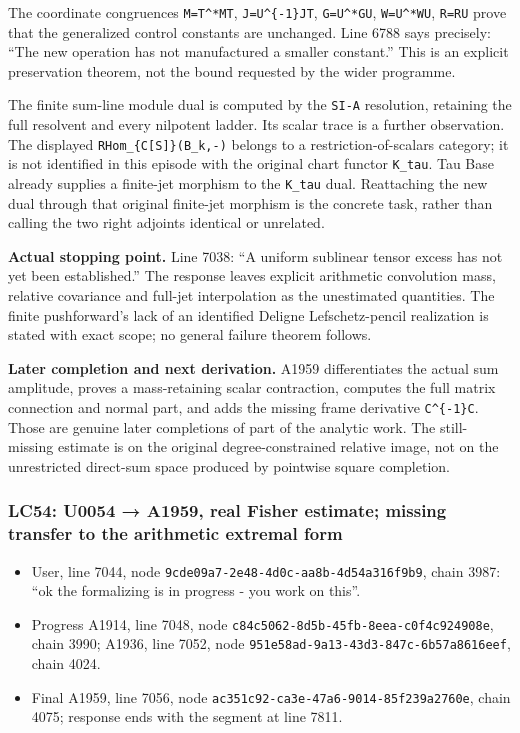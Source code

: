 The coordinate congruences \texttt{M\textquotesingle{}=T\^{}*MT},
\texttt{J\textquotesingle{}=U\^{}\{-1\}JT},
\texttt{G\textquotesingle{}=U\^{}*GU},
\texttt{W\textquotesingle{}=U\^{}*WU}, \texttt{R\textquotesingle{}=RU}
prove that the generalized control constants are unchanged. Line 6788
says precisely: ``The new operation has not manufactured a smaller
constant.'' This is an explicit preservation theorem, not the bound
requested by the wider programme.

The finite sum-line module dual is computed by the \texttt{SI-A}
resolution, retaining the full resolvent and every nilpotent ladder. Its
scalar trace is a further observation. The displayed
\texttt{RHom\_\{C{[}S{]}\}(B\_k,-)} belongs to a restriction-of-scalars
category; it is not identified in this episode with the original chart
functor \texttt{K\_tau}. Tau Base already supplies a finite-jet morphism
to the \texttt{K\_tau} dual. Reattaching the new dual through that
original finite-jet morphism is the concrete task, rather than calling
the two right adjoints identical or unrelated.

\textbf{Actual stopping point.} Line 7038: ``A uniform sublinear tensor
excess has not yet been established.'' The response leaves explicit
arithmetic convolution mass, relative covariance and full-jet
interpolation as the unestimated quantities. The finite pushforward's
lack of an identified Deligne Lefschetz-pencil realization is stated
with exact scope; no general failure theorem follows.

\textbf{Later completion and next derivation.} A1959 differentiates the
actual sum amplitude, proves a mass-retaining scalar contraction,
computes the full matrix connection and normal part, and adds the
missing frame derivative \texttt{C\^{}\{-1\}C\textquotesingle{}}. Those
are genuine later completions of part of the analytic work. The
still-missing estimate is on the original degree-constrained relative
image, not on the unrestricted direct-sum space produced by pointwise
square completion.

\subsubsection{LC54: U0054 → A1959, real Fisher estimate; missing
transfer to the arithmetic extremal
form}\label{lc54-u0054-a1959-real-fisher-estimate-missing-transfer-to-the-arithmetic-extremal-form}

\begin{itemize}
\tightlist
\item
  User, line 7044, node \texttt{9cde09a7-2e48-4d0c-aa8b-4d54a316f9b9},
  chain 3987: ``ok the formalizing is in progress - you work on this''.
\item
  Progress A1914, line 7048, node
  \texttt{c84c5062-8d5b-45fb-8eea-c0f4c924908e}, chain 3990; A1936, line
  7052, node \texttt{951e58ad-9a13-43d3-847c-6b57a8616eef}, chain 4024.
\item
  Final A1959, line 7056, node
  \texttt{ac351c92-ca3e-47a6-9014-85f239a2760e}, chain 4075; response
  ends with the segment at line 7811.
\end{itemize}

